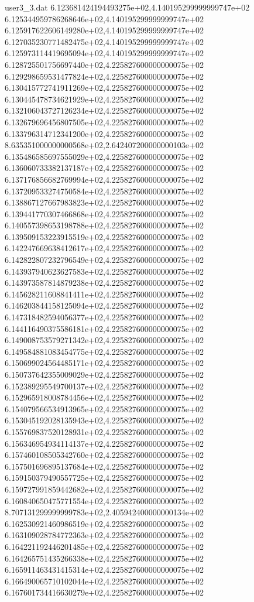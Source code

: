 \begin{filecontents}{user3_3.dat}
6.123681424194493275e+02,4.140195299999999747e+02
6.125344959786268646e+02,4.140195299999999747e+02
6.125917622606149280e+02,4.140195299999999747e+02
6.127035230771482475e+02,4.140195299999999747e+02
6.125973114419695094e+02,4.140195299999999747e+02
6.128725501756697440e+02,4.225827600000000075e+02
6.129298659531477824e+02,4.225827600000000075e+02
6.130415772741911269e+02,4.225827600000000075e+02
6.130445478734621929e+02,4.225827600000000075e+02
6.132106043727126234e+02,4.225827600000000075e+02
6.132679696456807505e+02,4.225827600000000075e+02
6.133796314712341200e+02,4.225827600000000075e+02
8.635351000000000568e+02,2.642407200000000103e+02
6.135486585697555029e+02,4.225827600000000075e+02
6.136060733382137187e+02,4.225827600000000075e+02
6.137176856682769994e+02,4.225827600000000075e+02
6.137209533274750584e+02,4.225827600000000075e+02
6.138867127667983823e+02,4.225827600000000075e+02
6.139441770307466868e+02,4.225827600000000075e+02
6.140557398653198788e+02,4.225827600000000075e+02
6.139509153223915519e+02,4.225827600000000075e+02
6.142247669638412617e+02,4.225827600000000075e+02
6.142822807232796549e+02,4.225827600000000075e+02
6.143937940623627583e+02,4.225827600000000075e+02
6.143973587814879238e+02,4.225827600000000075e+02
6.145628211608841411e+02,4.225827600000000075e+02
6.146203844158125094e+02,4.225827600000000075e+02
6.147318482594056377e+02,4.225827600000000075e+02
6.144116490375586181e+02,4.225827600000000075e+02
6.149008753579271342e+02,4.225827600000000075e+02
6.149584881083454775e+02,4.225827600000000075e+02
6.150699024564485171e+02,4.225827600000000075e+02
6.150737642355009029e+02,4.225827600000000075e+02
6.152389295549700137e+02,4.225827600000000075e+02
6.152965918008784456e+02,4.225827600000000075e+02
6.154079566534913965e+02,4.225827600000000075e+02
6.153045192028135943e+02,4.225827600000000075e+02
6.155769837520128931e+02,4.225827600000000075e+02
6.156346954934114137e+02,4.225827600000000075e+02
6.157460108505342760e+02,4.225827600000000075e+02
6.157501696895137684e+02,4.225827600000000075e+02
6.159150379490557725e+02,4.225827600000000075e+02
6.159727991859442682e+02,4.225827600000000075e+02
6.160840650475771554e+02,4.225827600000000075e+02
8.707131299999999783e+02,2.405942400000000134e+02
6.162530921460986519e+02,4.225827600000000075e+02
6.163109028784772363e+02,4.225827600000000075e+02
6.164221192446201485e+02,4.225827600000000075e+02
6.164265751435266338e+02,4.225827600000000075e+02
6.165911463431415314e+02,4.225827600000000075e+02
6.166490065710102044e+02,4.225827600000000075e+02
6.167601734416630279e+02,4.225827600000000075e+02

\end{filecontents}
